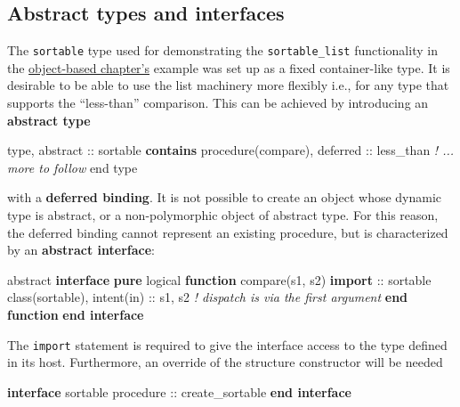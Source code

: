 \documentclass[
  paper=a4,
  ,captions=tableheading
]{scrartcl}
\newenvironment{Shaded}{\begin{snugshade}}{\end{snugshade}}
\newcommand{\CommentTok}[1]{\textcolor[rgb]{0.56,0.35,0.01}{\textit{#1}}}
\newcommand{\DataTypeTok}[1]{\textcolor[rgb]{0.13,0.29,0.53}{#1}}
\newcommand{\KeywordTok}[1]{\textcolor[rgb]{0.13,0.29,0.53}{\textbf{#1}}}
\newcommand{\NormalTok}[1]{#1}
\begin{document}
\subsection{Abstract types and
interfaces}\label{abstract-types-and-interfaces}

The \texttt{sortable} type used for demonstrating the
\texttt{sortable\_list} functionality in the
\hyperref[sec:oop_techniques]{object-based chapter's} example was set up
as a fixed container-like type. It is desirable to be able to use the
list machinery more flexibly i.e., for any type that supports the
``less-than'' comparison. This can be achieved by introducing an
\textbf{abstract type}

\begin{Shaded}
\begin{Highlighting}[]
\DataTypeTok{type}\NormalTok{, }\DataTypeTok{abstract} \DataTypeTok{::}\NormalTok{ sortable}
\KeywordTok{contains}
  \DataTypeTok{procedure(compare)}\NormalTok{, }\DataTypeTok{deferred} \DataTypeTok{::}\NormalTok{ less\_than}
  \CommentTok{! ... more to follow}
\DataTypeTok{end type}
\end{Highlighting}
\end{Shaded}

with a \textbf{deferred binding}. It is not possible to create an object
whose dynamic type is abstract, or a non-polymorphic object of abstract
type. For this reason, the deferred binding cannot represent an existing
procedure, but is characterized by an \textbf{abstract interface}:

\begin{Shaded}
\begin{Highlighting}[]
\DataTypeTok{abstract} \KeywordTok{interface}
  \KeywordTok{pure} \DataTypeTok{logical} \KeywordTok{function}\NormalTok{ compare(s1, s2)}
    \KeywordTok{import} \DataTypeTok{::}\NormalTok{ sortable}
    \DataTypeTok{class(sortable)}\NormalTok{, }\DataTypeTok{intent(in)} \DataTypeTok{::}\NormalTok{ s1, s2}
    \CommentTok{! dispatch is via the first argument}
  \KeywordTok{end function}
\KeywordTok{end interface}
\end{Highlighting}
\end{Shaded}

The \texttt{import} statement is required to give the interface access
to the type defined in its host. Furthermore, an override of the
structure constructor will be needed

\begin{Shaded}
\begin{Highlighting}[]
\KeywordTok{interface}\NormalTok{ sortable}
  \DataTypeTok{procedure} \DataTypeTok{::}\NormalTok{ create\_sortable}
\KeywordTok{end interface}
\end{Highlighting}
\end{Shaded}
\end{document}
